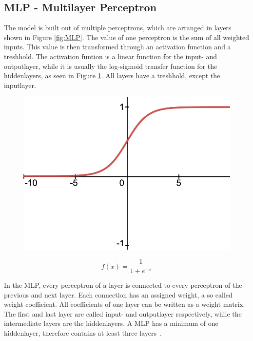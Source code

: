 \documentclass[11pt]{scrartcl}
\begin{document}
	\subsection{MLP - Multilayer Perceptron}
	
	The model is built out of multiple perceptrons, which are arranged in layers shown in Figure \ref{fig:MLP}. The value of one perceptron is the sum of all weighted inputs. This value is then transformed through an activation function and a treshhold. The activation funtion is a linear function for the input- and outputlayer, while it is usually the log-sigmoid transfer function for the hiddenlayers, as seen in Figure \ref{fig:log-sigmoid function}. All layers have a treshhold, except the inputlayer. 
	
	\begin{figure}[H]
	\centering
	\begin{minipage}{.5\textwidth}
	  \centering
	  \includegraphics[width=0.5\linewidth]{figures/log-sigmoid.png}
	\end{minipage}%
	\begin{minipage}{.5\textwidth}
	  \centering
		\begin{equation*}
			f(x) = \frac{1}{1 +e^{-x}}
		\end{equation*}
	\end{minipage}
	\label{fig:log-sigmoid function}
	\end{figure}
	
	In the MLP, every perceptron of a layer is connected to every perceptron of the previous and next layer. Each connection has an assigned weight, a so called weight coefficient. All coefficients of one layer can be written as a weight matrix. The first and last layer are called input- and outputlayer respectively, while the intermediate layers are the hiddenlayers. A MLP has a minimum of one hiddenlayer, therefore contains at least three layers~\cite{MLP08}.
	
\end{document}
